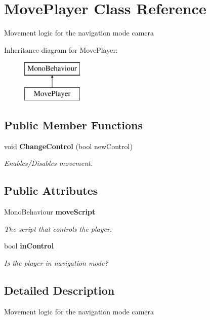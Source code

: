 \section{Move\+Player Class Reference}
\label{class_move_player}


Movement logic for the navigation mode camera  


Inheritance diagram for Move\+Player\+:\begin{figure}[H]
\begin{center}
\leavevmode
\includegraphics[height=2.000000cm]{class_move_player}
\end{center}
\end{figure}
\subsection*{Public Member Functions}
\begin{DoxyCompactItemize}
\item 
void {\bf Change\+Control} (bool new\+Control)
\begin{DoxyCompactList}\small\item\em Enables/\+Disables movement. \end{DoxyCompactList}\end{DoxyCompactItemize}
\subsection*{Public Attributes}
\begin{DoxyCompactItemize}
\item 
Mono\+Behaviour {\bf move\+Script}
\begin{DoxyCompactList}\small\item\em The script that controls the player. \end{DoxyCompactList}\item 
bool {\bf in\+Control}
\begin{DoxyCompactList}\small\item\em Is the player in navigation mode? \end{DoxyCompactList}\end{DoxyCompactItemize}


\subsection{Detailed Description}
Movement logic for the navigation mode camera 



